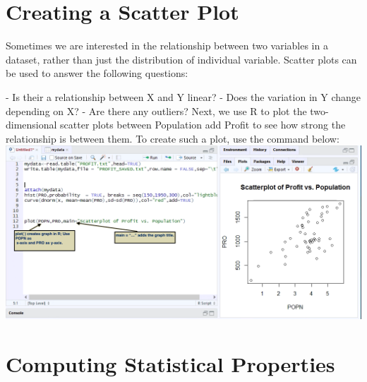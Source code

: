 \documentclass[a4paper]{report}
\begin{document}
    \section{Creating a Scatter Plot}
        \begin{flushleft}
        Sometimes we are interested in the relationship between two variables in a dataset, rather than just the distribution of individual variable. Scatter plots can be used to answer the following questions:

        - Is their a relationship between X and Y linear? \newline
	    - Does the variation in Y change depending on X?
	    \newline
        - Are there any outliers?
        \newline
        Next, we use R to plot the two-dimensional scatter plots between Population add Profit to see how strong the relationship is between them. To create such a plot, use the command below: \newline \newline
        \includegraphics[width=\textwidth]{images/SCATTER1.png}

        \end{flushleft}
        
    \section{Computing Statistical Properties}
    
\end{document}
